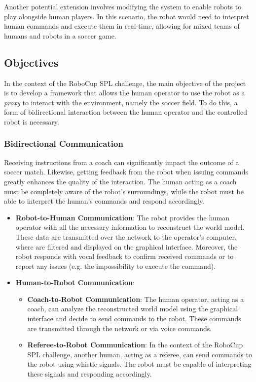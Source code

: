 \documentclass[a4paper, onecolumn, 12pt]{article}
\begin{document}
Another potential extension involves modifying the system to enable robots to play alongside human players. 
In this scenario, the robot would need to interpret human commands and execute them in real-time, allowing 
for mixed teams of humans and robots in a soccer game.

\subsection{Objectives}
\label{sec:obj}

In the context of the RoboCup SPL challenge, the main objective of the project is to develop a framework
that allows the human operator to use the robot as a \textit{proxy} to interact with the environment, namely the soccer
field. 
To do this, a form of bidirectional interaction between the human operator and the controlled robot is necessary. 

\subsubsection{Bidirectional Communication}  
Receiving instructions from a coach can significantly impact the outcome of a soccer match. 
Likewise, getting feedback from the robot when issuing commands greatly enhances 
the quality of the interaction. The human acting as a coach must be completely aware of the robot's surroundings,
while the robot must be able to interpret the human's commands and respond accordingly. 
\begin{itemize}  
    \item \textbf{Robot-to-Human Communication}: The robot provides the human operator with 
    all the necessary information to reconstruct the world model. These data are transmitted 
    over the network to the operator's computer, where are filtered and displayed on the 
    graphical interface. Moreover, the robot responds with vocal feedback to confirm received 
    commands or to report any issues (e.g. the impossibility to execute the command).  
    \item \textbf{Human-to-Robot Communication}:  
    \begin{itemize}  
        \item \textbf{Coach-to-Robot Communication}: The human operator, acting as a coach, can 
        analyze the reconstructed world model using the graphical interface and decide to send commands to the robot. 
        These commands are transmitted through the network or via voice commands.  
        \item \textbf{Referee-to-Robot Communication}: In the context of the RoboCup 
        SPL challenge, another human, acting as a referee, can send commands to the robot using 
        whistle signals. The robot must be capable of interpreting these signals and responding 
        accordingly.
    \end{itemize}  
\end{itemize}
\end{document}
